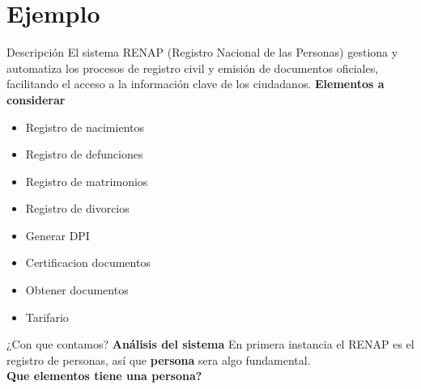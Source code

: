 \documentclass[spanish]{beamer}
\begin{document}
\section{Ejemplo}
    \begin{frame}{Descripción}
    El sistema RENAP (Registro Nacional de las Personas) gestiona y automatiza los procesos de registro civil y emisión de documentos oficiales, facilitando el acceso a la información clave de los ciudadanos.
    \textbf{Elementos a considerar}
    \begin{itemize}
        \item Registro de nacimientos
        \item Registro de defunciones
        \item Registro de matrimonios
        \item Registro de divorcios
        \item Generar DPI 
        \item Certificacion documentos
        \item Obtener documentos
        \item Tarifario
        
    \end{itemize}
    \end{frame}
    \begin{frame}{¿Con que contamos?}
        \textbf{Análisis del sistema}
        En primera instancia el RENAP es el registro de personas, así que \textbf{persona} sera algo fundamental.
        \\
        \textbf{Que elementos tiene una persona?}
\begin{table}[h]
    \centering
    \caption{Ejemplo de persona}
    \label{tab:ejemplo}
\end{table}

    \end{frame}
\end{document}
